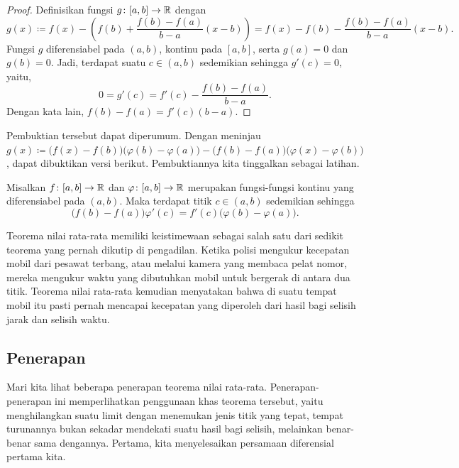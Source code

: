 \begin{proof}
Definisikan
fungsi $g \colon [a,b] \to {\mathbb{R}}$ dengan
\begin{equation*}
g(x) \coloneqq
f(x)-
\left( f(b)+\frac{f(b)-f(a)}{b-a}(x-b) \right)
=
f(x)-
f(b)-\frac{f(b)-f(a)}{b-a}(x-b) .
\end{equation*}
Fungsi $g$ diferensiabel pada $(a,b)$,
kontinu pada $[a,b]$, serta $g(a) = 0$ dan $g(b) = 0$.  Jadi, terdapat
suatu
$c \in (a,b)$ sedemikian sehingga $g'(c) = 0$, yaitu,
\begin{equation*}
0 = g'(c) = f'(c)-\frac{f(b)-f(a)}{b-a} .
\end{equation*}
Dengan kata lain,
$f(b)-f(a) = f'(c)(b-a)$.
\end{proof}

Pembuktian tersebut dapat diperumum.  Dengan meninjau
$g(x) \coloneqq
\bigl(f(x)-f(b)\bigr)
\bigl(\varphi(b)-\varphi(a)\bigr)
-
\bigl(f(b)-f(a)\bigr)
\bigl(\varphi(x)-\varphi(b)\bigr)$,
dapat dibuktikan versi berikut.  Pembuktiannya kita tinggalkan sebagai latihan.

\begin{thm} \label{thm:cauchymvt}
Misalkan $f \colon [a,b] \to {\mathbb{R}}$ dan $\varphi \colon [a,b] \to {\mathbb{R}}$ merupakan
fungsi-fungsi kontinu yang
diferensiabel pada $(a,b)$.  Maka terdapat titik $c \in (a,b)$
sedemikian sehingga
\begin{equation*}
\bigl(f(b)-f(a)\bigr)\varphi'(c) = f'(c)\bigl(\varphi(b)-\varphi(a)\bigr) .
\end{equation*}
\end{thm}

Teorema nilai rata-rata memiliki keistimewaan sebagai salah satu dari sedikit teorema yang
pernah dikutip
di pengadilan.  Ketika polisi mengukur kecepatan mobil dari pesawat terbang, atau
melalui kamera yang membaca pelat nomor, mereka 
mengukur waktu yang dibutuhkan mobil untuk bergerak di antara dua titik.
Teorema nilai rata-rata kemudian
menyatakan bahwa di suatu tempat mobil itu pasti pernah mencapai kecepatan yang diperoleh dari hasil bagi
selisih jarak dan selisih waktu.



\subsection{Penerapan}

Mari kita lihat beberapa penerapan teorema nilai rata-rata.
Penerapan-penerapan ini memperlihatkan penggunaan khas teorema tersebut, yaitu
menghilangkan suatu limit dengan menemukan jenis titik yang tepat, tempat
turunannya bukan sekadar mendekati suatu hasil bagi selisih, melainkan benar-benar
sama dengannya.
Pertama, kita menyelesaikan persamaan diferensial pertama kita.

